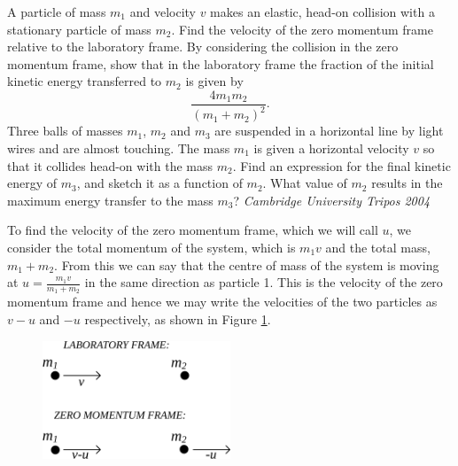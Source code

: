 
%
%
\begin{problem} %
 {A particle of mass $m_{1}$ and velocity $v$ makes an elastic, head-on collision with a stationary particle of mass $m_{2}$.  Find the velocity of the zero momentum frame relative to the laboratory frame.  By considering the collision in the zero momentum frame, show that in the laboratory frame the fraction of the initial kinetic energy transferred to $m_{2}$ is given by
 \begin{equation}
  \frac{4m_{1}m_{2}}{(m_{1}+m_{2})^{2}}.
 \end{equation}
Three balls of masses $m_{1}$, $m_{2}$ and $m_{3}$ are suspended in a horizontal line by light wires and are almost touching.  The mass $m_{1}$ is given a horizontal velocity $v$ so that it collides head-on with the mass $m_{2}$.  Find an expression for the final kinetic energy of $m_{3}$, and sketch it as a function of $m_{2}$.  What value of $m_{2}$ results in the maximum energy transfer to the mass $m_{3}$?}
{\textit{Cambridge University Tripos 2004}}
{
To find the velocity of the zero momentum frame, which we will call $u$, we consider the total momentum of the system, which is $m_1 v$ and the total mass, $m_1 + m_2$. From this we can say that the centre of mass of the system is moving at $u=\frac{m_1 v}{m_1 + m_2}$ in the same direction as particle 1. This is the velocity of the zero momentum frame and hence we may write the velocities of the two particles as $v-u$ and $-u$ respectively, as shown in Figure \ref{fig:Tripos_Elastic_ZMF_1}.

\begin{figure}[h]
	\centering
	\includegraphics[width=0.5\textwidth]{../../../figures/Tripos_Elastic_ZMF_1.svg}
	\caption{}
	\label{fig:Tripos_Elastic_ZMF_1}
\end{figure}

}
\end{problem}

